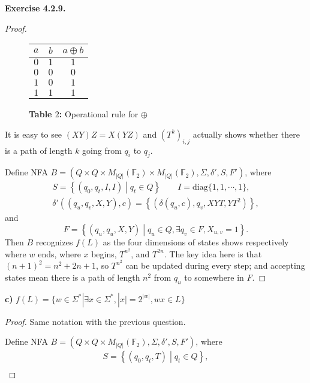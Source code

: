 \documentclass[a4paper]{article}
\newtheorem*{proof}{Proof}
\newenvironment{exercise}[1]{
	\par
	\noindent\textbf{Exercise #1.}\quad
}{
	\par
	\bigskip
}
\newcommand{\Fset}{\mathbb{F}}
\begin{document}
\begin{exercise}{4.2.9}
\begin{proof}
\begin{figure}[ht!]
\begin{minipage}[b]{0.5\textwidth}
          \end{minipage}%
          \begin{minipage}[b]{0.5\textwidth}
            \centering
            \begin{tabular}{|c|c|c|} \hline
                $a$ & $b$ & $a\oplus b$\\ \hline\hline
                $0$ & $1$ & $1$ \\ \hline
                $0$ & $0$ & $0$ \\ \hline
                $1$ & $0$ & $1$ \\ \hline
                $1$ & $1$ & $1$ \\ \hline
            \end{tabular}
            \caption*{\textbf{Table $2$:} Operational rule for $\oplus$}
          \end{minipage}
        \end{figure}\par
        It is easy to see $(XY)Z=X(YZ)$ and $(T^k)_{i,j}$ actually shows whether there is 
        a path of length $k$ going from $q_i$ to $q_j$.\par
        Define NFA $B=(Q\times Q\times M_{|Q|}(\Fset_2)\times M_{|Q|}(\Fset_2),\Sigma,\delta',S,F')$, where 
        \begin{gather*}
            S=\left\{(q_0,q_t,I,I)\middle|q_t\in Q\right\}\qquad I=\text{diag}\{1,1,\cdots,1\},\\
            \delta'\left((q_u,q_v,X,Y),c\right)=\left\{\left(\delta(q_u,c),q_v,XYT,YT^2\right)\right\},
        \end{gather*}
        and 
        $$
        F=\left\{(q_u,q_u,X,Y)\middle|q_u\in Q,\exists q_v\in F,X_{u,v}=1\right\}.
        $$
        Then $B$ recognizes $f(L)$ as the four dimensions of states shows respectively
        where $w$ ends, where $x$ begins, $T^{n^2}$, and $T^{2n}$. The key idea here is 
        that $(n+1)^2=n^2+2n+1$, so $T^{n^2}$ can be updated during every step;
        and accepting states mean there is a path of length $n^2$ from $q_u$ to somewhere in
        $F$.
    \end{proof}
    \textbf{c)} $f(L)=\{w\in\Sigma^*|\exists x\in\Sigma^*,|x|=2^{|w|},wx\in L\}$
    \begin{proof}
        Same notation with the previous question.\par
        Define NFA $B=(Q\times Q\times M_{|Q|}(\Fset_2),\Sigma,\delta',S,F')$, where 
        \begin{gather*}
            S=\left\{(q_0,q_t,T)\middle|q_t\in Q\right\},\\

\end{gather*}
\end{proof}
\end{exercise}
\end{document}
